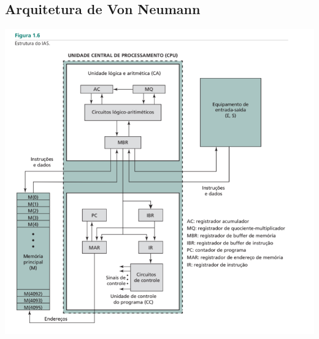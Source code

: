 \documentclass{article}
\begin{document}
		\subsection{Arquitetura de Von Neumann}
			\includegraphics[scale=1]{estruturaDoIAS.jpg}	
\end{document}
